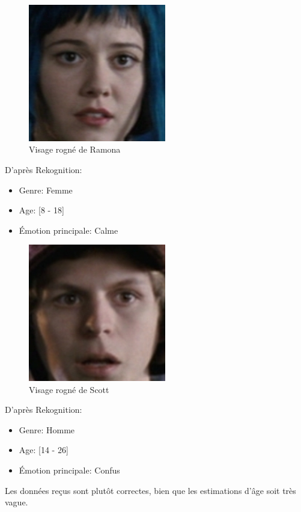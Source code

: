 \begin{figure}[H]
	\centering
	\includegraphics[width=6cm]{images/facial_reco/ramona.png}
    \caption{Visage rogné de Ramona}
	\label{fig:hidden_face_ramona}
\end{figure}

D'après Rekognition:
\begin{itemize}
    \item Genre: Femme
    \item Age: [8 - 18]
    \item Émotion principale: Calme 
\end{itemize}

\begin{figure}[H]
	\centering
	\includegraphics[width=6cm]{images/facial_reco/scott_hidden.png}
    \caption{Visage rogné de Scott}
	\label{fig:hidden_face_scott}
\end{figure}

D'après Rekognition:
\begin{itemize}
    \item Genre: Homme
    \item Age: [14 - 26]
    \item Émotion principale: Confus 
\end{itemize}

Les données reçus sont plutôt correctes, bien que les estimations d'âge soit très vague.


